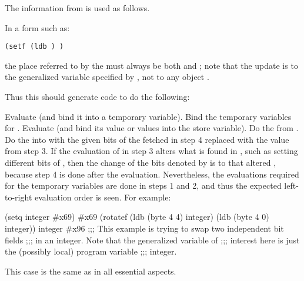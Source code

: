 The information from
is used as follows.
\beginlist
{} 
 
In a form such as:
       
{\tt (setf (ldb  ) )}
 
the place referred to by the  must always be both  
and ;  note that the update is to the generalized variable 
specified by , not to any object .
       
Thus this  should generate code to do the following:
 
\beginlist
{} Evaluate  (and bind it into a temporary variable).
 Bind the temporary variables for .
 Evaluate   (and bind 
its value or values into the store variable).
 Do the  from .
 Do the  into  with 
the given bits of the 
       fetched in step 4 replaced with the value from step 3.
\endlist 
    If the evaluation of  
in step 3 alters what is found in ,
such as setting different bits of ,
    then the change of the bits denoted by 
 is to that 
    altered , 
because step 4 is done after the 
    evaluation.  Nevertheless, the 
    evaluations required for  
the temporary variables are done in steps 1 and 
    2, and thus the expected left-to-right evaluation order is seen.
For example:

\code
 (setq integer #x69) \EV #x69
 (rotatef (ldb (byte 4 4) integer) 
          (ldb (byte 4 0) integer))
 integer \EV #x96
;;; This example is trying to swap two independent bit fields 
;;; in an integer.  Note that the generalized variable of 
;;; interest here is just the (possibly local) program variable
;;; integer.
\endcode
 
 
   This case is the same as  in all essential aspects.
 
